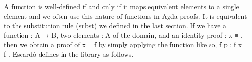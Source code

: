 \scpad

A function is well-defined if and only if it maps equivalent elements to a single element and we often use this nature of functions in Agda proofs.  It is equivalent to the substitution rule (subst) we defined in the last section. If we have a function  \as : \ab A \as → \ab B, two elements   \as : \ab A of the domain, and an identity proof  \as : \ab x \ad ≡ , then we obtain a proof of  \ab x \ad ≡ \ab f  by simply applying the  function like so,  \ab f \ab p \as : \ab f \ab x \ad ≡ \ab f . Escardó defines  in the \typetopology library as follows.
\ccpad
\begin{code}%
\>[1]\AgdaSpace{}%
\AgdaSymbol{:}\AgdaSpace{}%
\AgdaSymbol{\{}\AgdaSpace{}%
\AgdaSymbol{:}\AgdaSpace{}%
\AgdaSpace{}%
\AgdaSymbol{\}\{}\AgdaSpace{}%
\AgdaSymbol{:}\AgdaSpace{}%
\AgdaSpace{}%
\AgdaSymbol{\}}
\AgdaSymbol{(}\AgdaSpace{}%
\AgdaSymbol{:}\AgdaSpace{}%
\AgdaSpace{}%
\AgdaSpace{}%
\AgdaSymbol{)\{}\AgdaSpace{}%
\AgdaSpace{}%
\AgdaSymbol{:}\AgdaSpace{}%
\AgdaSymbol{\}}\AgdaSpace{}%
\AgdaSpace{}%
\AgdaSpace{}%
\AgdaSpace{}%
\AgdaSpace{}%
\AgdaSpace{}%
\AgdaSpace{}%
\AgdaSpace{}%
\AgdaSpace{}%
\AgdaSpace{}%
\<%
\\
%
\>[1]\AgdaSpace{}%
\AgdaSpace{}%
\AgdaSymbol{\{}\AgdaSymbol{\}}\AgdaSpace{}%
\AgdaSpace{}%
\AgdaSymbol{=}\AgdaSpace{}%
\AgdaSpace{}%
\AgdaSpace{}%
\AgdaBound{-}\AgdaSpace{}%
\AgdaSpace{}%
\AgdaSpace{}%
\AgdaSpace{}%
\AgdaSpace{}%
\AgdaSpace{}%
\AgdaBound{-}\AgdaSymbol{)}\AgdaSpace{}%
\AgdaSpace{}%
\AgdaSymbol{(}\AgdaSpace{}%
\AgdaSymbol{\{}\AgdaSpace{}%
\AgdaSymbol{=}\AgdaSpace{}%
\AgdaSpace{}%
\AgdaSymbol{\})}\<%
\end{code}
